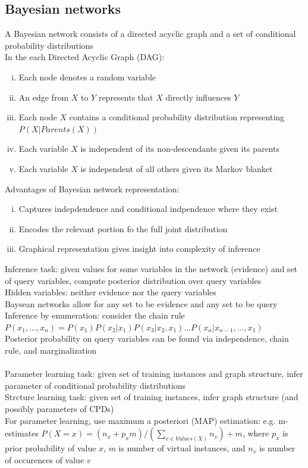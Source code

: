 \documentclass{article}
\begin{document}
		\subsection{Bayesian networks}
			A Bayesian network consists of a directed acyclic graph and a set of conditional probability distributions \\
			In the each Directed Acyclic Graph (DAG):
			\begin{enumerate}[(i)]
				\item Each node denotes a random variable
				\item An edge from $X$ to $Y$ represents that $X$ directly influences $Y$
				\item Each node $X$ contains a conditional probability distribution representing $P(X|Parents(X))$
				\item Each variable $X$ is independent of its non-descendants given its parents
				\item Each variable $X$ is independent of all others given its Markov blanket
				\end{enumerate}
			Advantages of Bayesian network representation:
			\begin{enumerate}[(i)]
				\item Captures indepdendence and conditional indpendence where they exist
				\item Encodes the relevant  portion fo the full joint distribution
				\item Graphical representation gives insight into complexity of inference
				\end{enumerate}
			Inference task: given values for some variables in the network (evidence) and set of query variables, compute posterior distribution over query variables \\
			Hidden variables: neither evidence nor the query variables \\
			Baysean networks allow for any set to be evidence and any set to be query \\
			Inference by enumeration: consider the chain rule $P(x_1, ..., x_n) = P(x_1)P(x_2|x_1)P(x_3|x_2, x_1)...P(x_n|x_{n-1}, ..., x_1)$ \\
			Posterior probability on query variables can be found via independence, chain rule, and marginalization \\
			\\
			Parameter learning task: given set of training instances and graph structure, infer parameter of conditional probability distributions \\
			Strcture learning task: given set of training instances, infer graph structure (and possibly parameters of CPDs) \\
			For parameter learning, use maximum a posteriori (MAP) estimation: e.g. m-estimates $P(X = x) = (n_x + p_xm)/(\sum_{v \in Values(X)} n_v) + m$, where $p_x$ is prior probability of value $x$, $m$ is number of virtual instances, and $n_v$ is number of occurences of value $v$ 
\end{document}
